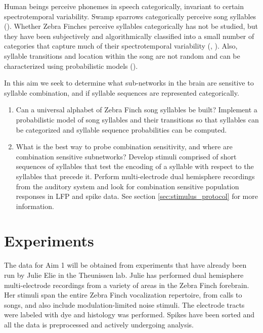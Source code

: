 \documentclass[12pt,article,oneside]{memoir}
\begin{document}
Human beings perceive phonemes in speech categorically, invariant to certain spectrotemporal variability.
Swamp sparrows categorically perceive song syllables (\cite{Prather2009}). Whether Zebra Finches
perceive syllables categorically has not be studied, but they have been subjectively and
algorithmically classified into a small number of categories that capture much of their spectrotemporal
variability (\cite{Zann1996}, \cite{Lachlan2010}). Also, syllable transitions and location within the
song are not random and can be characterized using probabilistic models (\cite{Katahira2011}).

In this aim we seek to determine what sub-networks in the brain are sensitive to syllable combination,
and if syllable sequences are represented categorically. 

   \begin{enumerate}

   \item
   Can a universal alphabet of Zebra Finch song syllables be built? Implement a probabilistic model
   of song syllables and their transitions so that syllables can be categorized and syllable sequence
   probabilities can be computed.

   \item
   What is the best way to probe combination sensitivity, and where are combination sensitive
   subnetworks? Develop stimuli comprised of short sequences of syllables that test the encoding
   of a syllable with respect to the syllables that precede it. Perform multi-electrode dual
   hemisphere recordings from the auditory system and look for combination sensitive population
   responses in LFP and spike data. See section \ref{sec:stimulus_protocol} for more information.
   
   \end{enumerate}


\section{Experiments}

The data for Aim 1 will be obtained from experiments that have already been run by Julie
Elie in the Theunissen lab. Julie has performed dual hemisphere multi-electrode recordings from
a variety of areas in the Zebra Finch forebrain. Her stimuli span the entire Zebra Finch
vocalization repertoire, from calls to songs, and also include modulation-limited noise stimuli.
The electrode tracts were labeled with dye and histology was performed. Spikes have been sorted
and all the data is preprocessed and actively undergoing analysis.
\end{document}
